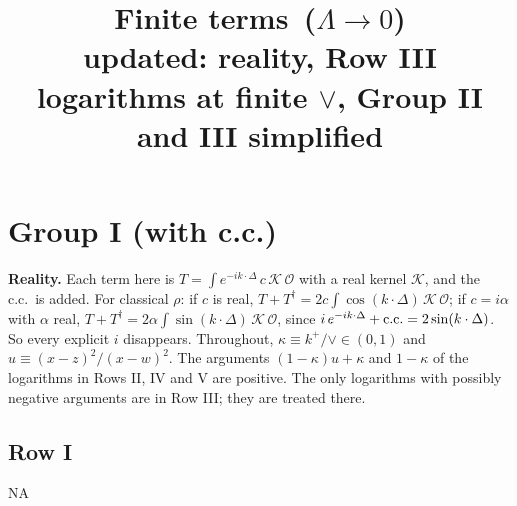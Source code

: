 \documentclass[9pt]{article}
\title{Finite terms\, ($\Lambda\to 0$)\\[4pt] \normalsize {\color{red}updated: reality, Row III logarithms at finite $\vee$, Group II and III simplified}}
\author{}
\date{}
\numberwithin{equation}{section}
\begin{document}
\maketitle
\section{Group I (with c.c.)}
{\color{red}\textbf{Reality.} Each term here is $T=\int e^{-ik\cdot\Delta}\,c\,\mathcal K\,\mathcal O$ with a real kernel $\mathcal K$, and the c.c.\ is added. For classical $\rho$: if $c$ is real, $T+T^{\dagger}=2c\int\cos(k\cdot\Delta)\,\mathcal K\,\mathcal O$; if $c=i\alpha$ with $\alpha$ real, $T+T^{\dagger}=2\alpha\int\sin(k\cdot\Delta)\,\mathcal K\,\mathcal O$, since $i\,e^{-ik\cdot\Delta}+{\rm c.c.}=2\sin(k\cdot\Delta)$. So every explicit $i$ disappears. Throughout, $\kappa\equiv k^{+}/\vee\in(0,1)$ and $u\equiv(x-z)^{2}/(x-w)^{2}$. The arguments $(1-\kappa)u+\kappa$ and $1-\kappa$ of the logarithms in Rows II, IV and V are positive. The only logarithms with possibly negative arguments are in Row III; they are treated there.}
\subsection{Row I}
\textsc{NA}
\end{document}
